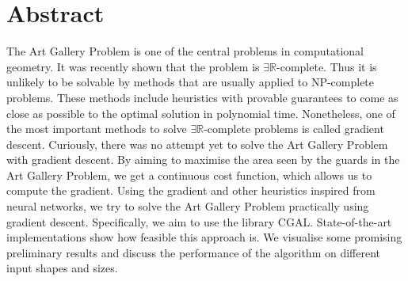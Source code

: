 \section*{Abstract}


The Art Gallery Problem is one of the central problems in computational geometry. It was recently shown that the problem is $\exists \mathbb{R}$-complete. Thus it is unlikely to be solvable by methods that are usually applied to NP-complete problems. These methods include heuristics with provable guarantees to come as close as possible to the optimal solution in polynomial time. Nonetheless, one of the most important methods to solve $\exists \mathbb{R}$-complete problems is called gradient descent. Curiously, there was no attempt yet to solve the Art Gallery Problem with gradient descent. By aiming to maximise the area seen by the guards in the Art Gallery Problem, we get a continuous cost function, which allows us to compute the gradient. Using the gradient and other heuristics inspired from neural networks, we try to solve the Art Gallery Problem practically using gradient descent. Specifically, we aim to use the library CGAL. 
State-of-the-art implementations show how feasible this approach is. We visualise some promising preliminary results and discuss the performance of the algorithm on different input shapes and sizes.